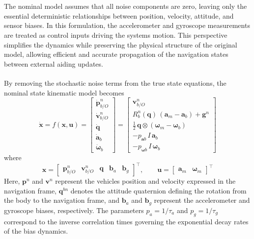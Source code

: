 \\ \\
The nominal model assumes that all noise components are zero, leaving only the essential deterministic relationships between position, velocity, attitude, and sensor biases. In this formulation, the accelerometer and gyroscope measurements are treated as control inputs driving the systems motion. This perspective simplifies the dynamics while preserving the physical structure of the original model, allowing efficient and accurate propagation of the navigation states between external aiding updates.  
\\ \\
By removing the stochastic noise terms from the true state equations, the nominal state kinematic model becomes
$$
    \dot{\mathbf{x}} = f(\mathbf{x}, \mathbf{u}) =
    \begin{bmatrix}
        \dot{\mathbf{p}}_{b/O}^{n} \\
        \dot{\mathbf{v}}_{b/O}^{n} \\
        \dot{\mathbf{q}} \\
        \dot{\mathbf{a}}_b \\
        \dot{\mathbf{\omega}}_b
    \end{bmatrix}
    =
    \begin{bmatrix}
        \mathbf{v}_{b/O}^{n} \\
        R_b^n(\mathbf{q})\,(\mathbf{a}_m - \mathbf{a}_{b}) + \mathbf{g}^n \\
        \tfrac{1}{2}\,\mathbf{q} \otimes (\boldsymbol{\omega}_m - \mathbf{\omega}_{b}) \\
        -p_{\mathbf{a}b}\,I\,\mathbf{a}_b \\
        -p_{\mathbf{\omega}b}\,I\,\mathbf{\omega}_b
    \end{bmatrix}
$$
where
$$
    \mathbf{x} =
    \begin{bmatrix}
        \mathbf{p}_{b/O}^{n} & \mathbf{v}_{b/O}^{n} & \mathbf{q} & \mathbf{b}_a & \mathbf{b}_g
    \end{bmatrix}^\top,
    \qquad
    \mathbf{u} =
    \begin{bmatrix}
        \mathbf{a}_m & \boldsymbol{\omega}_m
    \end{bmatrix}^\top
$$
Here, $\mathbf{p}^n$ and $\mathbf{v}^n$ represent the vehicles position and velocity expressed in the navigation frame, $\mathbf{q}^{bn}$ denotes the attitude quaternion defining the rotation from the body to the navigation frame, and $\mathbf{b}_a$ and $\mathbf{b}_g$ represent the accelerometer and gyroscope biases, respectively. The parameters $p_a = 1/\tau_a$ and $p_g = 1/\tau_g$ correspond to the inverse correlation times governing the exponential decay rates of the bias dynamics.  
